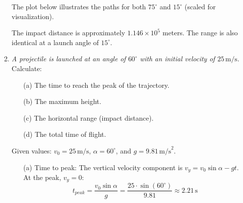 \documentclass[a4paper,12pt]{letter}
\begin{document}
\begin{enumerate}
The plot below illustrates the paths for both $75^\circ$ and $15^\circ$ (scaled for visualization).

\begin{center}
\end{center}

The impact distance is approximately $1.146 \times 10^{5}$ meters. The range is also identical at a launch angle of $15^\circ$.


\item \textit{A projectile is launched at an angle of $60^\circ$ with an initial velocity of $25\,\text{m/s}$.}
Calculate:
\begin{enumerate}
    \item[(a)] The time to reach the peak of the trajectory.
    \item[(b)] The maximum height.
    \item[(c)] The horizontal range (impact distance).
    \item[(d)] The total time of flight.
\end{enumerate}

\medskip

Given values: $v_0 = 25\,\text{m/s}$, $\alpha = 60^\circ$, and $g = 9.81\,\text{m/s}^2$.

\begin{enumerate}

\item[(a)] Time to peak: The vertical velocity component is $v_y = v_0 \sin\alpha - gt$. At the peak, $v_y = 0$:
\begin{equation}
    t_{peak} = \frac{v_0 \sin\alpha}{g} = \frac{25 \cdot \sin(60^\circ)}{9.81} \approx 2.21\,\text{s}
\end{equation}


\end{enumerate}
\end{enumerate}
\end{document}
